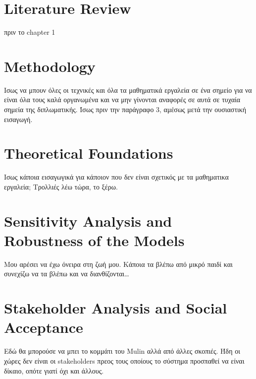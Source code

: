 \section{Literature Review}
πριν το chapter 1
\section{Methodology}
Ισως να μπουν όλες οι τεχνικές και όλα τα μαθηματικά εργαλεία σε ένα σημείο για να είναι όλα τους καλά οργανωμένα και να μην γίνονται αναφορές σε αυτά σε τυχαία σημεία της διπλωματικής. Ίσως πριν την παράγραφο 3, αμέσως μετά την ουσιαστική εισαγωγή.
\section{Theoretical Foundations}
Ισως κάποια εισαγωγικά για κάποιον που δεν είναι σχετικός με τα μαθηματικα εργαλεία; Τρολλιές λέω τώρα, το ξέρω.
\section{Sensitivity Analysis and Robustness of the Models}
Μου αρέσει να έχω όνειρα στη ζωή μου. Κάποια τα βλέπω από μικρό παιδί και συνεχίζω να τα βλέπω και να διανθίζονται\dots
\section{ Stakeholder Analysis and Social Acceptance}
Εδώ θα μπορούσε να μπει το κομμάτι του Mulin αλλά από άλλες σκοπιές. Ήδη οι χώρες δεν είναι οι stakeholders πρεος τους οποίους το σύστημα προσπαθεί να είναι δίκαιο, οπότε γιατί όχι και άλλους. 